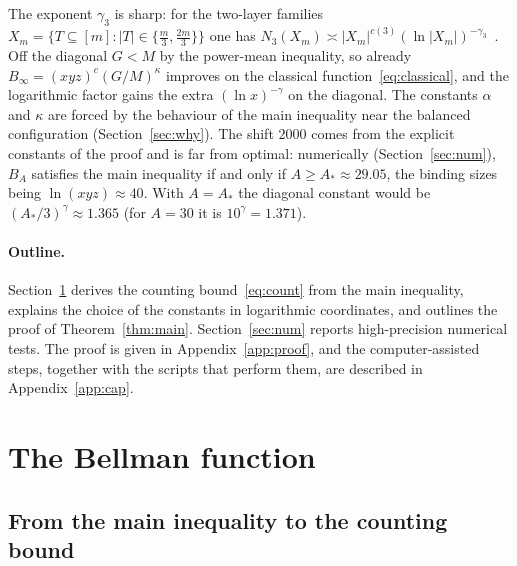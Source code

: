 \documentclass[11pt]{article}
\theoremstyle{definition}
\numberwithin{equation}{section}
\begin{document}
The exponent $\gamma_3$ is sharp: for the two-layer families $X_m=\{T\subseteq[m]:|T|\in\{\frac m3,\frac{2m}3\}\}$ one has
$N_3(X_m)\asymp|X_m|^{c(3)}(\ln|X_m|)^{-\gamma_3}$~\cite[Thm.~1.1(b)]{P}. Off the diagonal $G<M$ by the power-mean inequality,
so already $B_\infty=(xyz)^c(G/M)^\kappa$ improves on the classical function~\eqref{eq:classical}, and the logarithmic factor
gains the extra $(\ln x)^{-\gamma}$ on the diagonal. The constants $\alpha$ and $\kappa$ are forced by the behaviour of the main
inequality near the balanced configuration (Section~\ref{sec:why}). The shift $2000$ comes from the explicit constants of the
proof and is far from optimal: numerically (Section~\ref{sec:num}), $B_A$ satisfies the main inequality if and only if
$A\ge A_*\approx29.05$, the binding sizes being $\ln(xyz)\approx40$. With $A=A_*$ the diagonal constant would be
$(A_*/3)^\gamma\approx1.365$ (for $A=30$ it is $10^\gamma=1.371$).

\paragraph{Outline.} Section~\ref{sec:bellman} derives the counting bound~\eqref{eq:count} from the main inequality, explains
the choice of the constants in logarithmic coordinates, and outlines the proof of Theorem~\ref{thm:main}.
Section~\ref{sec:num} reports high-precision numerical tests. The proof is given in Appendix~\ref{app:proof}, and the
computer-assisted steps, together with the scripts that perform them, are described in Appendix~\ref{app:cap}.

\section{The Bellman function}\label{sec:bellman}
\subsection{From the main inequality to the counting bound}
\end{document}
